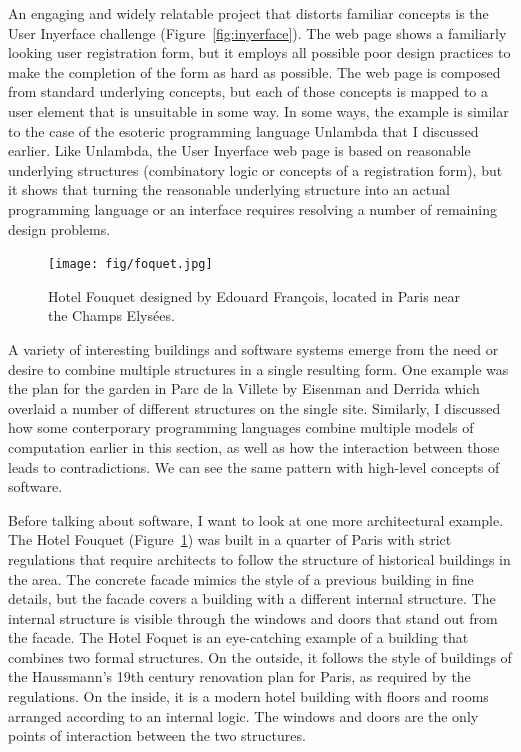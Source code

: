 An engaging and widely relatable project that distorts familiar concepts is the User
Inyerface challenge (Figure~\ref{fig:inyerface}). The web page shows a familiarly looking
user registration form, but it employs all possible poor design practices to make the completion
of the form as hard as possible. The web page is composed from standard underlying concepts,
but each of those concepts is mapped to a user element that is unsuitable in some way.
In some ways, the example is similar to the case of the esoteric programming language Unlambda
that I discussed earlier. Like Unlambda, the User Inyerface web page is based on reasonable
underlying structures (combinatory logic or concepts of a registration form), but it shows that
turning the reasonable underlying structure into an actual programming language or an interface
requires resolving a number of remaining design problems.

\begin{figure}
\centering
\vspace{-1em}
\texttt{[image: fig/foquet.jpg]}
\caption{Hotel Fouquet designed by Edouard Fran\c{c}ois, located in Paris near the Champs Elys\'ees.}
\label{fig:hotel}
\end{figure}

A variety of interesting buildings and software systems emerge from the need or desire to combine
multiple structures in a single resulting form. One example was the plan for the garden in Parc
de la Villete by Eisenman and Derrida which overlaid a number of different structures on the single
site. Similarly, I discussed how some conterporary programming languages combine multiple models
of computation earlier in this section, as well as how the interaction between those leads to
contradictions. We can see the same pattern with high-level concepts of software.

Before talking about software, I want to look at one more architectural example.
The Hotel Fouquet (Figure~\ref{fig:hotel}) was built in a quarter of Paris with
strict regulations that require architects to follow the structure of historical
buildings in the area. The concrete facade mimics the style of a previous building in
fine details, but the facade covers a building with a different internal structure.
The internal structure is visible through the windows and doors that stand out from the facade.
The Hotel Foquet is an eye-catching example of a building that combines two formal structures.
On the outside, it follows the style of buildings of the Haussmann's 19th century renovation
plan for Paris, as required by the regulations. On the inside, it is a modern hotel building with
floors and rooms arranged according to an internal logic. The windows and doors are the only
points of interaction between the two structures.

